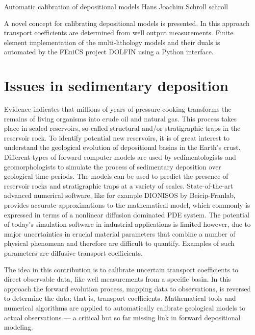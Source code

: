               {Automatic calibration of depositional models}
              {Hans Joachim Schroll}
              {schroll}

A novel concept for calibrating depositional models is presented.  In
this approach transport coefficients are determined from well output
measurements.  Finite element implementation of the multi-lithology
models and their duals is automated by the FEniCS project DOLFIN using
a Python interface.


\section{Issues in sedimentary deposition}

Evidence indicates that millions of years of pressure cooking
transforms the remains of living organisms into crude oil and natural
gas.  This process takes place in sealed reservoirs, so-called
structural and/or stratigraphic traps in the reservoir rock.  To
identify potential new reservoirs, it is of great interest to
understand the geological evolution of depositional basins in the
Earth's crust.  Different types of forward computer models are used by
sedimentologists and geomorphologists to simulate the process of
sedimentary deposition over geological time periods.  The models can
be used to predict the presence of reservoir rocks and stratigraphic
traps at a variety of scales. State-of-the-art advanced numerical
software, like for example DIONISOS by Beicip-Franlab, provides
accurate approximations to the mathematical model, which commonly is
expressed in terms of a nonlinear diffusion dominated PDE system.  The
potential of today's simulation software in industrial applications is
limited however, due to major uncertainties in crucial material
parameters that combine a number of physical phenomena and therefore
are difficult to quantify.  Examples of such parameters are diffusive
transport coefficients.

The idea in this contribution is to calibrate uncertain transport
coefficients to direct observable data, like well measurements from a
specific basin.  In this approach the forward evolution process,
mapping data to observations, is reversed to determine the data; that
is, transport coefficients.  Mathematical tools and numerical
algorithms are applied to automatically calibrate geological models to
actual observations --- a critical but so far missing link in forward
depositional modeling.

